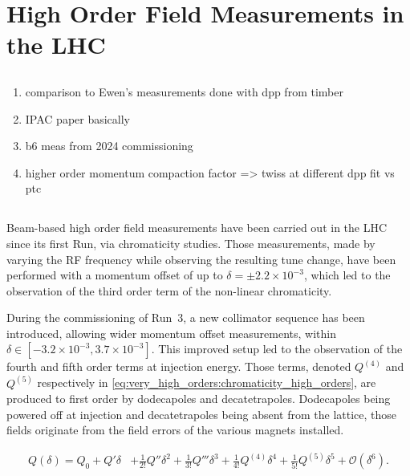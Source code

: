 \chapter{High Order Field Measurements in the LHC}
\thumbforchapter{}
\chaptertoc{}
\newpage

\section{}

\begin{enumerate}
\color{red}
    \item comparison to Ewen's measurements done with dpp from timber
    \item IPAC paper basically
    \item b6 meas from 2024 commissioning
    \item higher order momentum compaction factor => twiss at different dpp fit vs ptc
\end{enumerate}


\section{}

Beam-based high order field measurements have been carried out in the LHC since its first
Run, via chromaticity studies.
Those measurements, made by varying the RF frequency while observing the resulting tune change, have
been performed with a momentum offset of up to $\delta = \pm 2.2 \times 10^{-3}$, which led to the
observation of the third order term of the non-linear chromaticity.

During the commissioning of Run~3, a new collimator sequence has been introduced, allowing wider
momentum offset measurements, within $\delta \in [-3.2\times 10^{-3},3.7 \times 10^{-3}]$. This
improved setup led to the observation of the fourth and fifth order terms at injection energy.
Those terms, denoted $Q^{(4)}$ and $Q^{(5)}$ respectively in
\cref{eq:very_high_orders:chromaticity_high_orders}, are produced to first order by dodecapoles and
decatetrapoles. Dodecapoles being powered off at injection and decatetrapoles being absent from the
lattice, those fields originate from the field errors of the various magnets installed.

\begin{equation}
\begin{aligned}
Q(\delta) = Q_0 + Q'\delta &+ \frac{1}{2!}Q''\delta^2 + \frac{1}{3!}Q'''\delta^3
                            + \frac{1}{4!}Q^{(4)}\delta^4  + \frac{1}{5!}Q^{(5)}\delta^5
                            + \mathcal{O}(\delta^6).
\end{aligned}
    \label{eq:very_high_orders:chromaticity_high_orders}
\end{equation}





